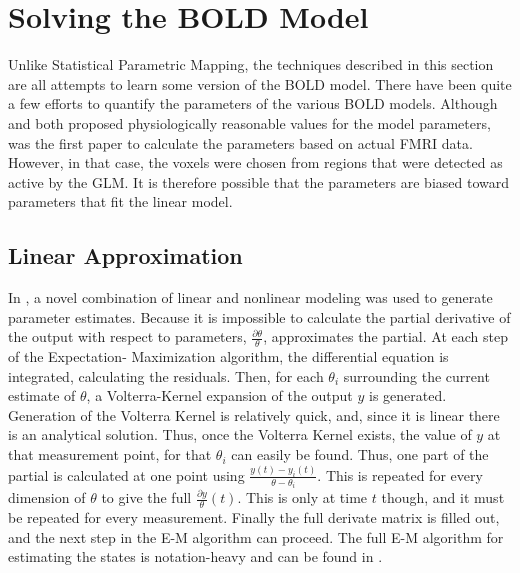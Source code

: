 \section{Solving the BOLD Model}
Unlike Statistical Parametric Mapping, the techniques described in this
section are all attempts to learn some version of the BOLD model. 
There have been quite a few efforts to quantify the parameters of the
various BOLD models.  Although \cite{Buxton1998} and \cite{Friston2000}
both proposed physiologically reasonable values for the model parameters, 
\cite{Friston2002b} was the first paper to calculate the parameters based 
on actual FMRI data. However, in that case, the voxels were chosen from
regions that were detected as active by the GLM. It is therefore possible
that the parameters are biased toward parameters that fit the linear model.

\subsection{Linear Approximation}
In \cite{Friston2002b}, a novel combination of linear and nonlinear modeling
was used to generate parameter estimates. Because it is impossible to 
calculate the partial derivative of
the output with respect to parameters, $\frac{\partial \theta}{\theta}$, 
\cite{Friston2002b} approximates the partial. At each step of the Expectation-
Maximization algorithm, the differential equation is integrated, calculating
the residuals. Then, for each $\theta_i$ surrounding the current estimate of 
$\theta$, a Volterra-Kernel expansion of the output $y$ is generated. Generation
of the Volterra Kernel is relatively quick, and, since it is linear there
is an analytical solution. Thus, once the Volterra Kernel exists, the value
of $y$ at that measurement point, for that $\theta_i$ can easily be found. 
Thus, one part of the partial is calculated at one point using
$\frac{y(t) - y_i(t)}{\theta - \theta_i}$. This is repeated for
every dimension of $\theta$ to give the full $\frac{\partial y}{\theta}(t)$.
This is only at time $t$ though, and it must be repeated for every
measurement. Finally the full derivate matrix is filled out, and
the next step in the E-M algorithm can proceed. The full E-M algorithm
for estimating the states is notation-heavy and can be found in \cite{Friston2002b}.

